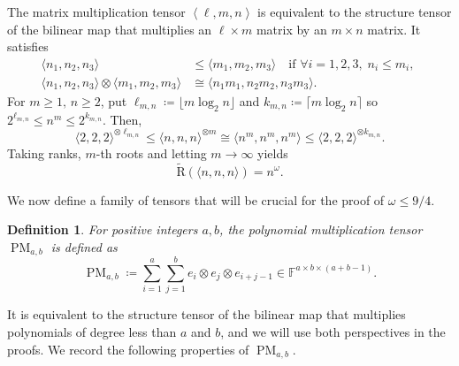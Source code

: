 \documentclass[11pt,letterpaper]{article}
\newtheorem{definition}[theorem]{Definition}\AddToHook{env/definition/begin}{\crefalias{theorem}{definition}}
\numberwithin{equation}{section}
\newcommand{\ark}{\widetilde{\mathrm{R}}}
\newcommand{\FF}{\mathbb{F}}
\DeclareMathOperator{\PM}{PM}
\begin{document}
The matrix multiplication tensor $\left<\ell, m, n\right>$ is equivalent to the structure tensor of the bilinear map that multiplies an $\ell \times m$ matrix by an $m \times n$ matrix.
It satisfies \[
\begin{split}
\langle n_1,n_2,n_3\rangle &\leq \langle m_1,m_2,m_3\rangle\quad \text{if } \forall i=1,2,3,\; n_i\leq m_i, \; \\
\langle n_1,n_2,n_3\rangle\otimes \langle m_1,m_2,m_3\rangle &\cong \langle n_1m_1, n_2m_2,n_3m_3\rangle.
\end{split}
\]
For $m\geq 1,\, n\geq 2$, put $\ell_{m,n}\coloneqq \lfloor m\log_2 n\rfloor$ and $k_{m,n}\coloneqq \lceil m\log_2 n\rceil$ so $2^{\ell_{m,n}}\leq n^m \leq 2^{k_{m,n}}$.
Then,
\begin{equation}
\label{eq:n-matmul-to-2}
\langle 2,2,2\rangle^{\otimes \ell_{m,n}} \leq \langle n,n,n\rangle^{\otimes m}\cong \langle n^m,n^m,n^m\rangle \leq  \langle 2,2,2\rangle^{\otimes k_{m,n}}.
\end{equation}
Taking ranks, $m$-th roots and letting $m\rightarrow\infty$ yields
\begin{equation}
\label{eq:omega-log-n}
\ark(\langle n,n,n\rangle) = n^\omega.
\end{equation}



  We now define a family of tensors that will be crucial for the proof of $\omega \leq 9/4$.
  \begin{definition}\label{def:polynomial-multiplication}
  For positive integers $a, b $, the \emph{polynomial multiplication tensor} $\PM_{a, b}$ is defined as
  \[ \PM_{a, b} \coloneqq \sum_{i = 1}^{a} \sum_{j = 1}^{b} e_i \otimes e_j \otimes e_{i + j - 1} \in \FF^{a \times b \times (a + b - 1)}. \]
\end{definition}
\noindent
It is equivalent to the structure tensor of the bilinear map that multiplies polynomials of degree less than $a$ and $b$, and we will use both perspectives in the proofs.
We record the following properties of $\PM_{a,b}$.
\end{document}
